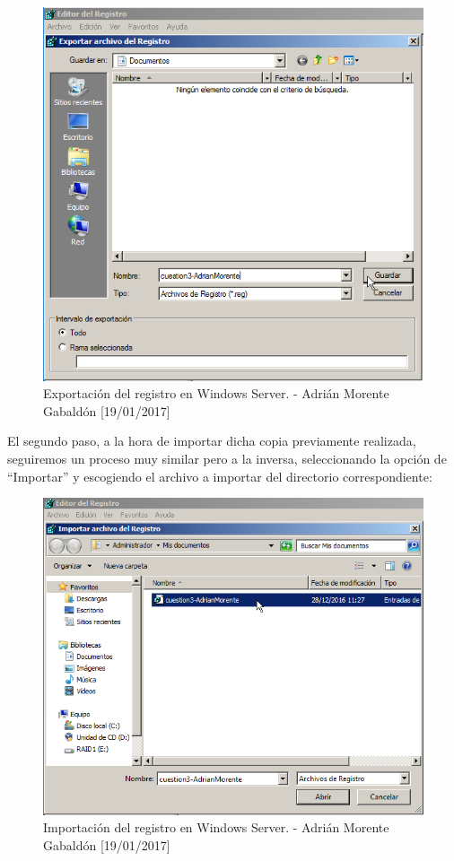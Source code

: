 	\begin{figure}[H]
		\centering
		\includegraphics[scale=0.8]{regedit-exportar2}
		\caption{Exportación del registro en Windows Server. - Adrián Morente Gabaldón [19/01/2017]}
		\label{figura8}
	\end{figure}
	El segundo paso, a la hora de importar dicha copia previamente realizada, seguiremos un proceso muy similar pero a la inversa, seleccionando la opción de 	``Importar'' y escogiendo el archivo a importar del directorio correspondiente:
	\begin{figure}[H]
		\centering
		\includegraphics[scale=0.7]{regedit-importar}
		\caption{Importación del registro en Windows Server. - Adrián Morente Gabaldón [19/01/2017]}
		\label{figura9}
	\end{figure}
